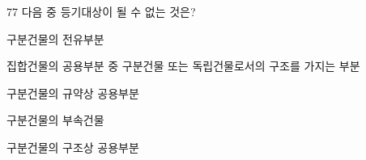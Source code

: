 \begin{question}{77}
다음 중 등기대상이 될 수 없는 것은?
\begin{choices}
  \item 구분건물의 전유부분
  \item 집합건물의 공용부분 중 구분건물 또는 독립건물로서의 구조를 가지는 부분
  \item 구분건물의 규약상 공용부분
  \item 구분건물의 부속건물
  \item 구분건물의 구조상 공용부분
\end{choices}
\end{question}
